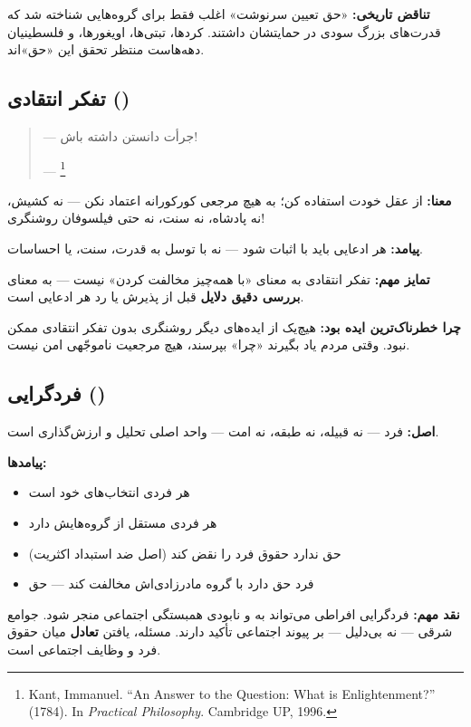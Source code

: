 \textbf{تناقض تاریخی:} «حق تعیین سرنوشت» اغلب فقط برای گروه‌هایی شناخته
شد که قدرت‌های بزرگ سودی در حمایتشان داشتند. کردها، تبتی‌ها، اویغورها،
و فلسطینیان دهه‌هاست منتظر تحقق این «حق»اند.


\subsection{تفکر انتقادی (\texorpdfstring{}{Critical Thinking})}

\begin{tcolorbox}[wavebox, title={شعار روشنگری}]
\begin{quote}
\textbf{} — جرأت دانستن داشته باش!

— \footnote{Kant, Immanuel. ``An Answer to the
Question: What is Enlightenment?'' (1784). In \textit{Practical
Philosophy}. Cambridge UP, 1996.}
\end{quote}

\textbf{معنا:} از عقل خودت استفاده کن؛ به هیچ مرجعی کورکورانه اعتماد
نکن — نه کشیش، نه پادشاه، نه سنت، نه حتی فیلسوفان روشنگری!

\textbf{پیامد:} هر ادعایی باید با  اثبات شود — نه با
توسل به قدرت، سنت، یا احساسات.

\textbf{تمایز مهم:} تفکر انتقادی به معنای «با همه‌چیز مخالفت کردن» نیست
— به معنای \textbf{بررسی دقیق دلایل} قبل از پذیرش یا رد هر ادعایی است.

\textbf{چرا خطرناک‌ترین ایده بود:} هیچ‌یک از ایده‌های دیگر روشنگری بدون
تفکر انتقادی ممکن نبود. وقتی مردم یاد بگیرند «چرا» بپرسند، هیچ مرجعیت
ناموجّهی امن نیست.
\end{tcolorbox}


\subsection{فردگرایی (\texorpdfstring{}{Individualism})}

\begin{tcolorbox}[defbox, title={اصل و پیامدها}]
\textbf{اصل:} فرد — نه قبیله، نه طبقه، نه امت — واحد اصلی تحلیل و
ارزش‌گذاری است.

\textbf{پیامدها:}
\begin{itemize}
\item هر فردی  انتخاب‌های خود است
\item هر فردی  مستقل از گروه‌هایش دارد
\item {} حق ندارد حقوق فرد را نقض کند (اصل ضد استبداد
  اکثریت)
\item فرد حق دارد با گروه مادرزادی‌اش مخالفت کند — حق 
\end{itemize}

\textbf{نقد مهم:} فردگرایی افراطی می‌تواند به 
و نابودی همبستگی اجتماعی منجر شود. جوامع شرقی — نه بی‌دلیل — بر پیوند
اجتماعی تأکید دارند. مسئله، یافتن \textbf{تعادل} میان حقوق فرد و وظایف
اجتماعی است.
\end{tcolorbox}


